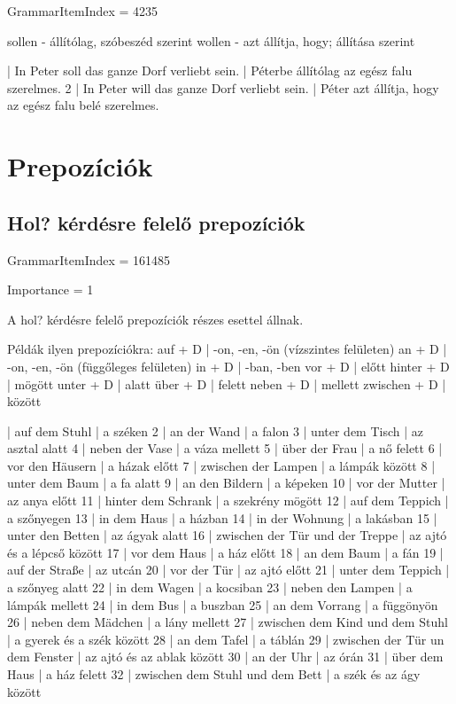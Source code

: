 \documentclass{article}
\newenvironment{desc}{\verbatim}{\endverbatim}
\newenvironment{exmp}{\verbatim}{\endverbatim}
\begin{document}
GrammarItemIndex = 4235

\begin{desc}

sollen - állítólag, szóbeszéd szerint
wollen - azt állítja, hogy; állítása szerint

\end{desc}

\begin{exmp}
1 | In Peter soll das ganze Dorf verliebt sein. | Péterbe állítólag az egész falu szerelmes.
2 | In Peter will das ganze Dorf verliebt sein. | Péter azt állítja, hogy az egész falu belé szerelmes.
\end{exmp}

\section{Prepozíciók}

\subsection{Hol? kérdésre felelő prepozíciók}

GrammarItemIndex = 161485

Importance = 1

\begin{desc}
A hol? kérdésre felelő prepozíciók részes esettel állnak.

Példák ilyen prepozíciókra:
auf + D      | -on, -en, -ön (vízszintes felületen)
an + D       | -on, -en, -ön (függőleges felületen)
in + D       | -ban, -ben
vor + D      | előtt
hinter + D   | mögött
unter + D    | alatt
über + D     | felett
neben + D    | mellett
zwischen + D | között
\end{desc}

\begin{exmp}
1 | auf dem Stuhl | a széken
2 | an der Wand | a falon
3 | unter dem Tisch | az asztal alatt
4 | neben der Vase | a váza mellett
5 | über der Frau | a nő felett
6 | vor den Häusern | a házak előtt
7 | zwischen der Lampen | a lámpák között
8 | unter dem Baum | a fa alatt
9 | an den Bildern | a képeken
10 | vor der Mutter | az anya előtt
11 | hinter dem Schrank | a szekrény mögött
12 | auf dem Teppich | a szőnyegen
13 | in dem Haus | a házban
14 | in der Wohnung | a lakásban
15 | unter den Betten | az ágyak alatt
16 | zwischen der Tür und der Treppe | az ajtó és a lépcső között
17 | vor dem Haus | a ház előtt
18 | an dem Baum | a fán
19 | auf der Straße | az utcán
20 | vor der Tür | az ajtó előtt
21 | unter dem Teppich | a szőnyeg alatt
22 | in dem Wagen | a kocsiban
23 | neben den Lampen | a lámpák mellett
24 | in dem Bus | a buszban
25 | an dem Vorrang | a függönyön
26 | neben dem Mädchen | a lány mellett
27 | zwischen dem Kind und dem Stuhl | a gyerek és a szék között
28 | an dem Tafel | a táblán
29 | zwischen der Tür un dem Fenster | az ajtó és az ablak között
30 | an der Uhr | az órán
31 | über dem Haus | a ház felett
32 | zwischen dem Stuhl und dem Bett | a szék és az ágy között
\end{exmp}
\end{document}
